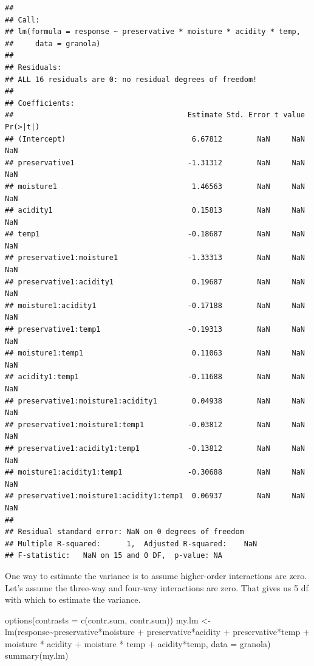 \documentclass[
]{book}
\newenvironment{Shaded}{\begin{snugshade}}{\end{snugshade}}
\newcommand{\AttributeTok}[1]{\textcolor[rgb]{0.77,0.63,0.00}{#1}}
\newcommand{\FunctionTok}[1]{\textcolor[rgb]{0.00,0.00,0.00}{#1}}
\newcommand{\NormalTok}[1]{#1}
\newcommand{\OtherTok}[1]{\textcolor[rgb]{0.56,0.35,0.01}{#1}}
\newcommand{\SpecialCharTok}[1]{\textcolor[rgb]{0.00,0.00,0.00}{#1}}
\newcommand{\StringTok}[1]{\textcolor[rgb]{0.31,0.60,0.02}{#1}}
\begin{document}
\begin{verbatim}
## 
## Call:
## lm(formula = response ~ preservative * moisture * acidity * temp, 
##     data = granola)
## 
## Residuals:
## ALL 16 residuals are 0: no residual degrees of freedom!
## 
## Coefficients:
##                                        Estimate Std. Error t value Pr(>|t|)
## (Intercept)                             6.67812        NaN     NaN      NaN
## preservative1                          -1.31312        NaN     NaN      NaN
## moisture1                               1.46563        NaN     NaN      NaN
## acidity1                                0.15813        NaN     NaN      NaN
## temp1                                  -0.18687        NaN     NaN      NaN
## preservative1:moisture1                -1.33313        NaN     NaN      NaN
## preservative1:acidity1                  0.19687        NaN     NaN      NaN
## moisture1:acidity1                     -0.17188        NaN     NaN      NaN
## preservative1:temp1                    -0.19313        NaN     NaN      NaN
## moisture1:temp1                         0.11063        NaN     NaN      NaN
## acidity1:temp1                         -0.11688        NaN     NaN      NaN
## preservative1:moisture1:acidity1        0.04938        NaN     NaN      NaN
## preservative1:moisture1:temp1          -0.03812        NaN     NaN      NaN
## preservative1:acidity1:temp1           -0.13812        NaN     NaN      NaN
## moisture1:acidity1:temp1               -0.30688        NaN     NaN      NaN
## preservative1:moisture1:acidity1:temp1  0.06937        NaN     NaN      NaN
## 
## Residual standard error: NaN on 0 degrees of freedom
## Multiple R-squared:      1,  Adjusted R-squared:    NaN 
## F-statistic:   NaN on 15 and 0 DF,  p-value: NA
\end{verbatim}

One way to estimate the variance is to assume higher-order interactions are zero. Let's assume the three-way and four-way interactions are zero. That gives us 5 df with which to estimate the variance.

\begin{Shaded}
\begin{Highlighting}[]
\FunctionTok{options}\NormalTok{(}\AttributeTok{contrasts =} \FunctionTok{c}\NormalTok{(}\StringTok{\textquotesingle{}contr.sum\textquotesingle{}}\NormalTok{, }\StringTok{\textquotesingle{}contr.sum\textquotesingle{}}\NormalTok{))}
\NormalTok{my.lm }\OtherTok{\textless{}{-}} \FunctionTok{lm}\NormalTok{(response}\SpecialCharTok{\textasciitilde{}}\NormalTok{preservative}\SpecialCharTok{*}\NormalTok{moisture }\SpecialCharTok{+}\NormalTok{ preservative}\SpecialCharTok{*}\NormalTok{acidity }\SpecialCharTok{+}\NormalTok{ preservative}\SpecialCharTok{*}\NormalTok{temp }\SpecialCharTok{+}\NormalTok{ moisture }\SpecialCharTok{*}\NormalTok{ acidity }\SpecialCharTok{+}\NormalTok{ moisture }\SpecialCharTok{*}\NormalTok{ temp }\SpecialCharTok{+}\NormalTok{ acidity}\SpecialCharTok{*}\NormalTok{temp, }\AttributeTok{data =}\NormalTok{ granola)}
\FunctionTok{summary}\NormalTok{(my.lm)}
\end{Highlighting}
\end{Shaded}
\end{document}
